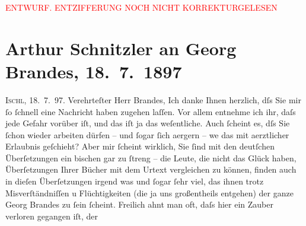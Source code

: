
\begin{center}
            \textcolor{red}{ENTWURF. ENTZIFFERUNG NOCH NICHT KORREKTURGELESEN}
                      \end{center}
            
               \section[Arthur Schnitzler an Georg Brandes, 18. 7. 1897]{ Arthur Schnitzler an Georg Brandes, 18. 7. 1897}\nopagebreak{}\rehead{ }\begin{ledgroupsized}[t]{13cm}\normalsize\beginnumbering{} \toendnotes[C]{\smallbreak\pagebreak[2]} 
\pstart
           \raggedleft{}{\pb}\textsc{Ischl}, 18. 7. 97. \pend
           \pstart{}Verehrteſter Herr Brandes,\pend\pstart
           Ich danke Ihnen herzlich, dſs Sie mir ſo ſchnell eine Nachricht haben zugehen
                    laſſen. Vor allem entnehme ich ihr, daſs jede Gefahr vorüber iſt, und das iſt ja
                    das weſentliche. Auch ſcheint es, dſs Sie ſchon wieder arbeiten dürfen – und
                    ſogar ſich aergern – we{\geminationn} das mit aerztlicher {\pb}Erlaubnis geſchieht? Aber mir ſcheint
                    wirklich, Sie ſind mit den deutſchen Überſetzungen ein bischen gar zu ſtreng –
                    die Leute, die nicht das Glück haben, Überſetzungen Ihrer Bücher mit dem Urtext
                    vergleichen zu können, finden auch in dieſen Überſetzungen irgend was und ſogar
                    ſehr viel, das \introOben{}ihnen\introOben{} trotz Misverſtändniſſen u
                    Flüchtigkeiten (die ja uns \introOben{}großentheils\introOben{} entgehen) der
                    ganze Georg Brandes zu ſein ſcheint. {\pb}Freilich ahnt man oft, daſs hier ein Zauber verloren gegangen iſt, der

\end{ledgroupsized}
